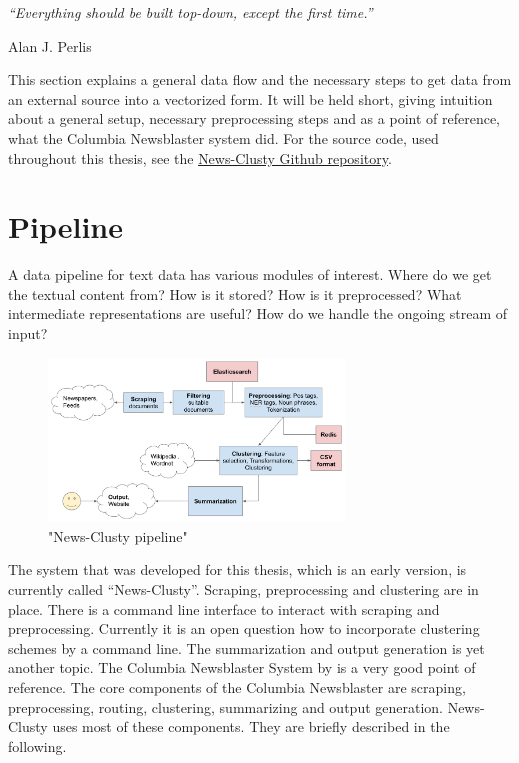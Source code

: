 \epigraph{\emph{
  ``Everything should be built top-down, except the first time.''
}}{ Alan J. Perlis }
 
This section explains a general data flow and the necessary steps to get data from an external source into a vectorized form. It will be held short, giving intuition about a general setup, necessary preprocessing steps and as a point of reference, what the Columbia Newsblaster system did. For the source code, used throughout this thesis, see the \href{https://github.com/sacry-/text-mining-haw-bachelor/}{News-Clusty Github repository}.

\section{Pipeline}
\label{sec:pipeline}
  
  A data pipeline for text data has various modules of interest. Where do we get the textual content from? How is it stored? How is it preprocessed? What intermediate representations are useful? How do we handle the ongoing stream of input?

  \begin{figure}[h!]
    \centering
      \includegraphics[width=0.7\textwidth]{news_clusty.png}
      \caption{"News-Clusty pipeline"}
      \label{news_clusty}
  \end{figure}

  The system that was developed for this thesis, which is an early version, is currently called ``News-Clusty''. Scraping, preprocessing and clustering are in place. There is a command line interface to interact with scraping and preprocessing. Currently it is an open question how to incorporate clustering schemes by a command line. The summarization and output generation is yet another topic. The Columbia Newsblaster System by \cite{ColumbiaMultiDoc2001} is a very good point of reference. The core components of the Columbia Newsblaster are scraping, preprocessing, routing, clustering, summarizing and output generation. News-Clusty uses most of these components. They are briefly described in the following.


